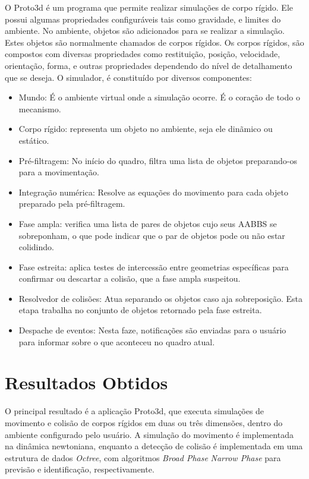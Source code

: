 \documentclass[12pt]{article}
\begin{document}

O Proto3d é um programa que permite realizar simulações de corpo rígido.
Ele possui algumas propriedades configuráveis tais como gravidade, e limites do ambiente.
No ambiente, objetos são adicionados para se realizar a simulação. Estes objetos são normalmente chamados de corpos rígidos.
Os corpos rígidos, são compostos com diversas propriedades como restituição, posição, velocidade, orientação, forma, e outras propriedades dependendo do nível de detalhamento que se deseja.
O simulador, é constituído  por diversos componentes:

\begin{itemize}
\item Mundo: É o ambiente virtual onde a simulação ocorre. É o coração de todo o mecanismo.
\item Corpo rígido: representa um objeto no ambiente, seja ele dinãmico ou estático.
\item Pré-filtragem: No início do quadro, filtra uma lista de objetos preparando-os para a movimentação.
\item Integração numérica: Resolve as equações do movimento para cada objeto preparado pela pré-filtragem.
\item Fase ampla: verifica uma lista de pares de objetos cujo seus AABBS se sobreponham, o que pode indicar que o par de objetos pode ou não estar colidindo.
\item Fase estreita: aplica testes de intercessão entre geometrias específicas para confirmar ou descartar a colisão, que a fase ampla suspeitou.
\item Resolvedor de colisões: Atua separando  os objetos caso aja sobreposição. Esta etapa trabalha no conjunto de objetos retornado pela fase estreita.
\item Despache de eventos: Nesta faze, notificações são enviadas para o usuário para informar sobre o que aconteceu no quadro atual.
\end{itemize}

\section{Resultados Obtidos}
O principal resultado é a aplicação Proto3d, que executa simulações de movimento e colisão de corpos rígidos em duas ou três dimensões, dentro do ambiente configurado pelo usuário. A simulação do movimento é implementada na dinâmica newtoniana, enquanto a detecção de colisão é implementada em uma estrutura de dados \emph{Octree}, com algoritmos \emph{Broad Phase} \emph{Narrow Phase} para previsão e identificação, respectivamente.
\end{document}
